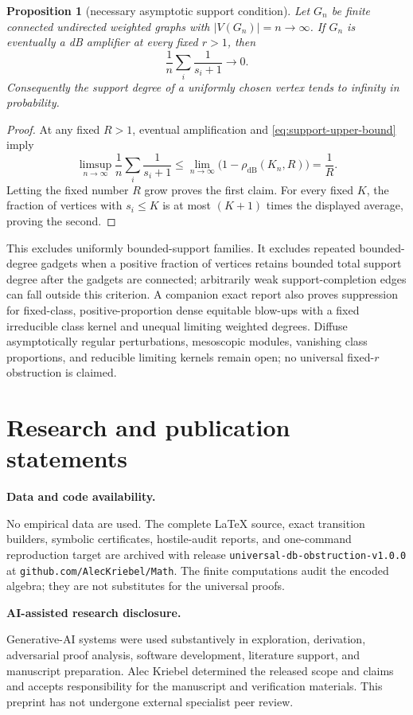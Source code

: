 \documentclass[11pt]{article}
\newtheorem{proposition}[theorem]{Proposition}
\newcommand{\dB}{\mathrm{dB}}
\begin{document}
\begin{proposition}[necessary asymptotic support condition]
Let $G_n$ be finite connected undirected weighted graphs with
$|V(G_n)|=n\to\infty$.  If $G_n$ is eventually a dB amplifier at every fixed
$r>1$, then
\[
 \frac1n\sum_i\frac1{s_i+1}\longrightarrow0.
\]
Consequently the support degree of a uniformly chosen vertex tends to
infinity in probability.
\end{proposition}

\begin{proof}
At any fixed $R>1$, eventual amplification and
\eqref{eq:support-upper-bound} imply
\[
 \limsup_{n\to\infty}\frac1n\sum_i\frac1{s_i+1}
 \le \lim_{n\to\infty}\bigl(1-\rho_{\dB}(K_n,R)\bigr)=\frac1R.
\]
Letting the fixed number $R$ grow proves the first claim.  For every fixed
$K$, the fraction of vertices with $s_i\le K$ is at most $(K+1)$ times the
displayed average, proving the second.
\end{proof}

This excludes uniformly bounded-support families.  It excludes repeated
bounded-degree gadgets when a positive fraction of vertices retains bounded
total support degree after the gadgets are connected; arbitrarily weak
support-completion edges can fall outside this criterion.  A companion exact
report also proves suppression for fixed-class,
positive-proportion dense equitable blow-ups with a fixed irreducible class
kernel and unequal limiting weighted degrees.  Diffuse asymptotically regular
perturbations, mesoscopic modules, vanishing class proportions, and reducible
limiting kernels remain open; no universal fixed-$r$ obstruction is claimed.

\section*{Research and publication statements}

\noindent\textbf{Data and code availability.}\par
No empirical data are used.  The complete LaTeX source, exact transition
builders, symbolic certificates, hostile-audit reports, and one-command
reproduction target are archived with release
\texttt{universal-db-obstruction-v1.0.0} at
\texttt{github.com/AlecKriebel/Math}.  The finite computations audit the
encoded algebra; they are not substitutes for the universal proofs.

\medskip
\noindent\textbf{AI-assisted research disclosure.}\par
Generative-AI systems were used substantively in exploration, derivation,
adversarial proof analysis, software development, literature support, and
manuscript preparation.  Alec Kriebel determined the released scope and
claims and accepts responsibility for the manuscript and verification
materials.  This preprint has not undergone external specialist peer review.
\end{document}
